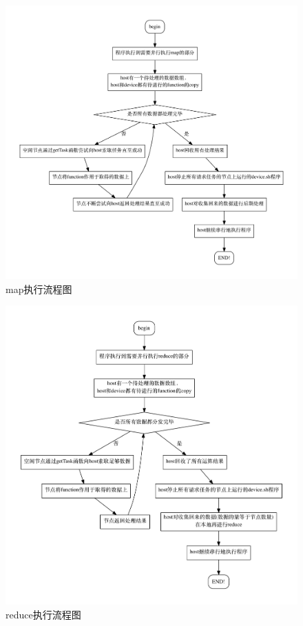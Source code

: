 \documentclass[paper=a4]{ctexart} %
\numberwithin{equation}{section} %
\numberwithin{figure}{section} %
\numberwithin{table}{section} %
\begin{document}
\begin{figure}[htbp]
\centering
\includegraphics[width=1\textwidth]{pic/graph_map.pdf}
\caption{map执行流程图}
\end{figure}

\begin{figure}[htbp]
\centering
\includegraphics[width=1\textwidth]{pic/graph_reduce.pdf}
\caption{reduce执行流程图}
\end{figure}
\end{document}
